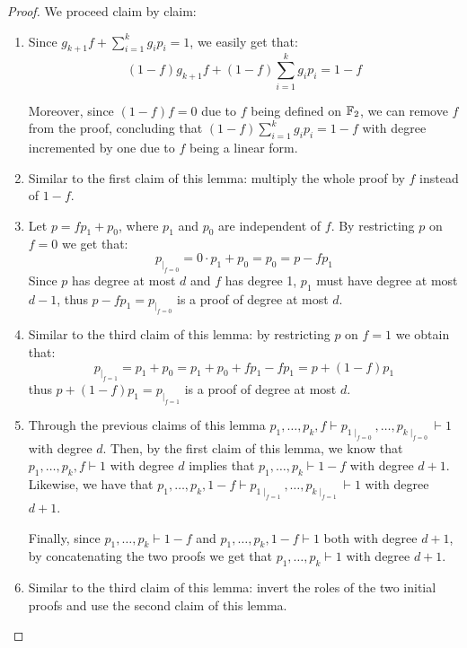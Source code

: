 \begin{proof}
    We proceed claim by claim:
    \begin{enumerate}
        \item Since $g_{k+1}f + \sum_{i = 1}^k g_i p_i = 1$, we easily get that:
        \[(1-f)g_{k+1}f + (1-f)\sum_{i = 1}^k g_i p_i = 1-f\]
        
        Moreover, since $(1-f) f = 0$ due to $f$ being defined on $\mathbb{F}_2$, we can remove $f$ from the proof, concluding that $(1-f)\sum_{i = 1}^k g_i p_i = 1-f$ with degree incremented by one due to  $f$ being a linear form.
    
        \item Similar to the first claim of this lemma: multiply the whole proof by $f$ instead of $1-f$.
        
        \item Let $p = f p_1 + p_0$, where $p_1$ and $p_0$ are independent of $f$. By restricting $p$ on $f = 0$ we get that:
        \[p_{\mid_{f=0}} = 0 \cdot p_1 + p_0 = p_0 = p - f p_1\]
        Since $p$ has degree at most $d$ and $f$ has degree 1, $p_1$ must have degree at most $d-1$, thus $p - f p_1 = p_{\mid_{f=0}}$ is a proof of degree at most $d$.
        
        \item Similar to the third claim of this lemma: by restricting $p$ on $f=1$ we obtain that:
        \[p_{\mid_{f=1}} = p_1 + p_0 = p_1 + p_0 + fp_1 - fp_1 = p+(1-f)p_1\]
        thus $p + (1-f)p_1 = p_{\mid_{f=1}}$ is a proof of degree at most $d$.

        \item Through the previous claims of this lemma $p_1, \ldots, p_k, f \vdash p_{1\mid_{f=0}}, \ldots, p_{k\mid_{f=0}} \vdash 1$ with degree $d$. Then, by the first claim of this lemma, we know that $p_1, \ldots, p_k, f \vdash  1$ with degree $d$ implies that $p_1, \ldots, p_k \vdash 1-f$ with degree $d+1$. Likewise, we have that $p_1, \ldots, p_k, 1-f \vdash p_{1\mid_{f=1}}, \ldots, p_{k\mid_{f=1}} \vdash 1$ with degree $d+1$.
        
        Finally, since $p_1, \ldots, p_k \vdash 1-f$ and $p_1, \ldots, p_k, 1-f \vdash 1$ both with degree $d+1$, by concatenating the two proofs we get that $p_1, \ldots, p_k \vdash 1$ with degree $d+1$.

        \item Similar to the third claim of this lemma: invert the roles of the two initial proofs and use the second claim of this lemma.
    \end{enumerate}
\end{proof}

